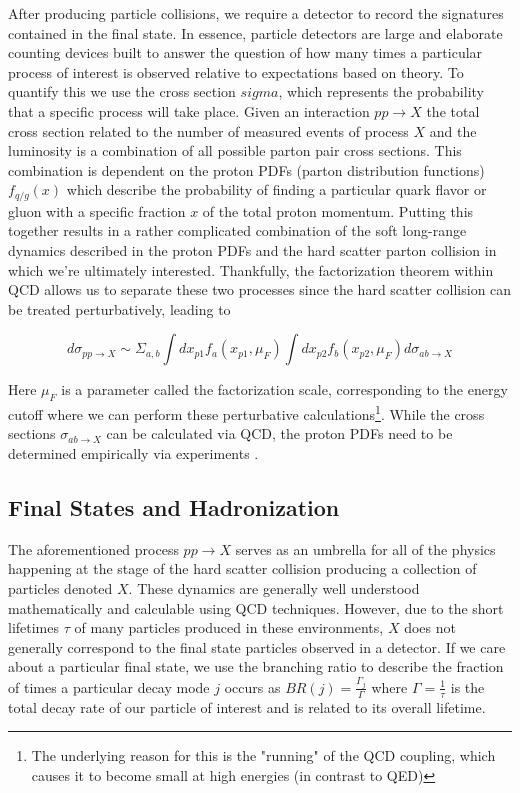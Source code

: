 After producing particle collisions, we require a detector to record the signatures contained in the final state.
In essence, particle detectors are large and elaborate counting devices built to answer the question of how many 
times a particular process of interest is observed relative to expectations based on theory. To quantify this we 
use the cross section $sigma$, which represents the probability that a specific process will take place. Given an 
interaction $pp \rightarrow X$ the total cross section related to the number of measured events of process $X$ 
and the luminosity is a combination of all possible parton pair cross sections. This combination is dependent on 
the proton PDFs (parton distribution functions) $f_{q/g}(x)$ which describe the probability of finding a 
particular quark flavor or gluon with a specific fraction $x$ of the total proton momentum. Putting this together 
results in a rather complicated combination of the soft long-range dynamics described in the proton PDFs and 
the hard scatter parton collision in which we're ultimately interested. Thankfully, the factorization theorem within 
QCD \cite{collins-qcd-factorization} allows us to separate these two processes since the hard scatter collision 
can be treated perturbatively, leading to 

\begin{equation}
d\sigma_{pp \rightarrow X} \sim 
\Sigma_{a,b} \int dx_{p1} f_{a}(x_{p1}, \mu_F) \int dx_{p2} f_{b}(x_{p2}, \mu_F) d\sigma_{ab \rightarrow X}
\label{eqn:parton-cross-section}
\end{equation}

Here $\mu_F$ is a parameter called the factorization scale, corresponding to the energy cutoff where we can 
perform these perturbative calculations\footnote{The underlying reason for this is the "running" of the QCD 
coupling, which causes it to become small at high energies (in contrast to QED)}. While the cross sections 
$\sigma_{ab \rightarrow X}$ can be calculated via QCD, the proton PDFs need to be determined empirically via 
experiments \cite{bailey-proton-pdfs}.

\subsection{Final States and Hadronization}

The aforementioned process $pp \rightarrow X$ serves as an umbrella for all of the physics happening at the 
stage of the hard scatter collision producing a collection of particles denoted $X$. These dynamics are generally 
well understood mathematically and calculable using QCD techniques. However, due to the short lifetimes $\tau$ 
of many particles produced in these environments, $X$ does not generally correspond to the final state particles 
observed in a detector. If we care about a particular final state, we use the branching ratio to describe the fraction 
of times a particular decay mode $j$ occurs as $BR(j) = \frac{\Gamma_j}{\Gamma}$ where 
$\Gamma = \frac{1}{\tau}$ is the total decay rate of our particle of interest and is related to its overall lifetime. \par

